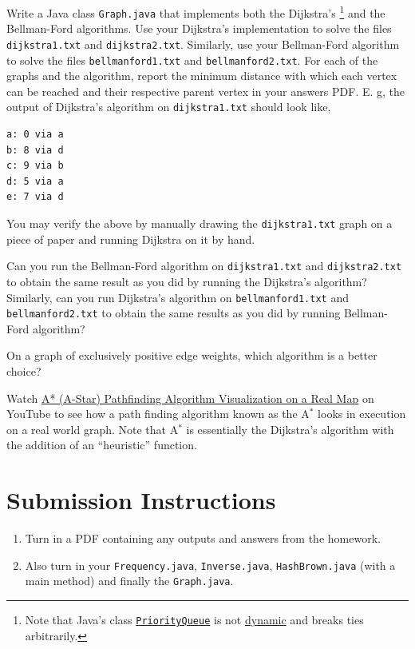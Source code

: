\documentclass{homework}
\newcommand\important{%
  \footnote{Note that Java's class \href{%
      https://docs.oracle.com/javase/8/docs/api/java/util/PriorityQueue.html%
    }{\texttt{PriorityQueue}} is not \href{%
      https://stackoverflow.com/q/2288241/12035739}{dynamic} %
    and breaks ties arbitrarily.}%
}
\begin{document}
Write a Java class \texttt{Graph.java} that implements both the
Dijkstra's\important{} and the Bellman-Ford algorithms. Use your
Dijkstra's implementation to solve the files
\texttt{dijkstra1.txt} and \texttt{dijkstra2.txt}. Similarly, use
your Bellman-Ford algorithm to solve the files
\texttt{bellmanford1.txt} and \texttt{bellmanford2.txt}. For each
of the graphs and the algorithm, report the minimum distance with
which each vertex can be reached and their respective parent
vertex in your answers PDF. E. g, the output of Dijkstra's
algorithm on \texttt{dijkstra1.txt} should look like,

\begin{verbatim}
a: 0 via a
b: 8 via d
c: 9 via b
d: 5 via a
e: 7 via d
\end{verbatim}

You may verify the above by manually drawing the
\texttt{dijkstra1.txt} graph on a piece of paper and running
Dijkstra on it by hand.

\question Can you run the Bellman-Ford algorithm on \texttt{dijkstra1.txt}
and \texttt{dijkstra2.txt} to obtain the same result as you did by
running the Dijkstra's algorithm? Similarly, can you run
Dijkstra's algorithm on \texttt{bellmanford1.txt} and
\texttt{bellmanford2.txt} to obtain the same results as you did by
running Bellman-Ford algorithm?

\question On a graph of exclusively positive edge weights, which algorithm
is a better choice?

\question Watch \href{https://www.youtube.com/watch?v=CgW0HPHqFE8}{A*
  (A-Star) Pathfinding Algorithm Visualization on a Real Map} on
YouTube to see how a path finding algorithm known as the A$^*$
looks in execution on a real world graph. Note that A$^*$ is
essentially the Dijkstra's algorithm with the addition of an
``heuristic'' function.

\section*{Submission Instructions}

\begin{enumerate}
  \item Turn in a PDF containing any outputs and answers from the
        homework.
  \item Also turn in your \texttt{Frequency.java}, \texttt{Inverse.java},
        \texttt{HashBrown.java} (with a main method) and finally the
        \texttt{Graph.java}.
\end{enumerate}
\end{document}
